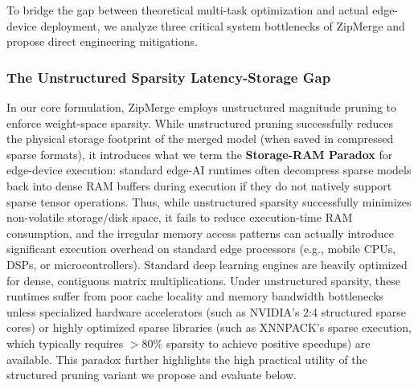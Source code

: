 To bridge the gap between theoretical multi-task optimization and actual edge-device deployment, we analyze three critical system bottlenecks of ZipMerge and propose direct engineering mitigations.

\subsubsection{The Unstructured Sparsity Latency-Storage Gap}
In our core formulation, ZipMerge employs unstructured magnitude pruning to enforce weight-space sparsity. While unstructured pruning successfully reduces the physical storage footprint of the merged model (when saved in compressed sparse formats), it introduces what we term the \textbf{Storage-RAM Paradox} for edge-device execution: standard edge-AI runtimes often decompress sparse models back into dense RAM buffers during execution if they do not natively support sparse tensor operations. Thus, while unstructured sparsity successfully minimizes non-volatile storage/disk space, it fails to reduce execution-time RAM consumption, and the irregular memory access patterns can actually introduce significant execution overhead on standard edge processors (e.g., mobile CPUs, DSPs, or microcontrollers). Standard deep learning engines are heavily optimized for dense, contiguous matrix multiplications. Under unstructured sparsity, these runtimes suffer from poor cache locality and memory bandwidth bottlenecks unless specialized hardware accelerators (such as NVIDIA's 2:4 structured sparse cores) or highly optimized sparse libraries (such as XNNPACK's sparse execution, which typically requires $>80\%$ sparsity to achieve positive speedups) are available. This paradox further highlights the high practical utility of the structured pruning variant we propose and evaluate below.

